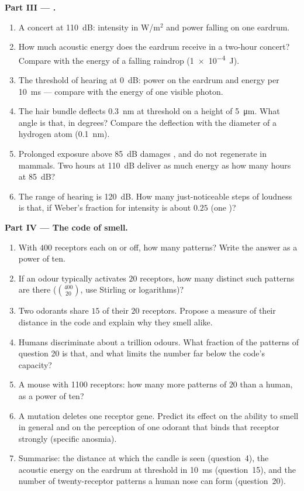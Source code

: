 \begin{problem}
\medskip
\noindent\textbf{Part III --- .}
\begin{enumerate}[resume]
  \item A concert at \qty{110}{dB}: intensity in W/m$^{2}$ and power
        falling on one eardrum.
  \item How much acoustic energy does the eardrum receive in a two-hour
        concert? Compare with the energy of a falling raindrop
        (\qty{1e-4}{J}).
  \item The threshold of hearing at \qty{0}{dB}: power on the eardrum
        and energy per \qty{10}{ms} --- compare with the energy of one
        visible photon.
  \item The hair bundle deflects \qty{0.3}{nm} at threshold on a height
        of \qty{5}{\micro m}. What angle is that, in degrees? Compare
        the deflection with the diameter of a hydrogen atom
        (\qty{0.1}{nm}).
  \item Prolonged exposure above \qty{85}{dB} damages , and
         do not regenerate in mammals. Two hours at
        \qty{110}{dB} deliver as much energy as how many hours at
        \qty{85}{dB}?
  \item The range of hearing is \qty{120}{dB}. How many just-noticeable
        steps of loudness is that, if Weber's fraction for intensity is
        about $0.25$ (one )?
\end{enumerate}

\medskip
\noindent\textbf{Part IV --- The code of smell.}
\begin{enumerate}[resume]
  \item With $400$ receptors each on or off, how many patterns? Write
        the answer as a power of ten.
  \item If an odour typically activates $20$ receptors, how many
        distinct such patterns are there ($\binom{400}{20}$, use
        Stirling or logarithms)?
  \item Two odorants share $15$ of their $20$ receptors. Propose a
        measure of their distance in the code and explain why they
        smell alike.
  \item Humans discriminate about a trillion odours. What fraction of
        the patterns of question 20 is that, and what limits the number
        far below the code's capacity?
  \item A mouse with \num{1100} receptors: how many more patterns of
        $20$ than a human, as a power of ten?
  \item A mutation deletes one receptor gene. Predict its effect on
        the ability to smell in general and on the perception of one
        odorant that binds that receptor strongly (specific anosmia).
  \item Summarise: the distance at which the candle is seen
        (question~4), the acoustic energy on the eardrum at threshold
        in \qty{10}{ms} (question~15), and the number of twenty-receptor
        patterns a human nose can form (question~20).
\end{enumerate}
\end{problem}
